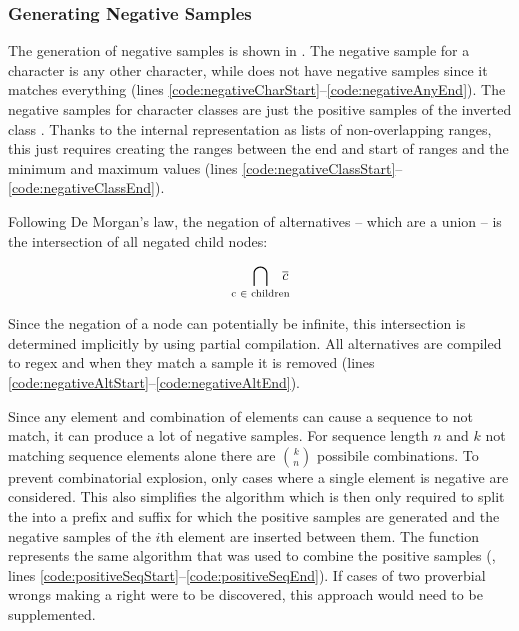 \FloatBarrier
\subsubsection{Generating Negative Samples}

The generation of negative samples is shown in . The negative sample for a character is any other character, while  does not have negative samples since it matches everything (lines \ref{code:negativeCharStart}--\ref{code:negativeAnyEnd}). The negative samples for character classes are just the positive samples of the inverted class . Thanks to the internal representation as lists of non-overlapping ranges, this just requires creating the ranges between the end and start of ranges and the minimum and maximum values (lines \ref{code:negativeClassStart}--\ref{code:negativeClassEnd}).

Following De Morgan's law, the negation of alternatives -- which are a union -- is the intersection of all negated child nodes:

\vspace{-1em}
\begin{equation*}
    \bigcap_{\text{c } \in \text{ children}} \hspace{-.7em}\overline{c}
\end{equation*}
\vspace{-1em}

Since the negation of a node can potentially be infinite, this intersection is determined implicitly by using partial compilation. All alternatives are compiled to regex and when they match a sample it is removed (lines \ref{code:negativeAltStart}--\ref{code:negativeAltEnd}).

Since any element and combination of elements can cause a sequence to not match, it can produce a lot of negative samples. For sequence length $n$ and $k$ not matching sequence elements alone there are ${k}\choose{n}$ possibile combinations. To prevent combinatorial explosion, only cases where a single element is negative are considered. This also simplifies the algorithm which is then only required to split the  into a prefix and suffix for which the positive samples are generated and the negative samples of the $i$th element are inserted between them. The function  represents the same algorithm that was used to combine the positive samples (, lines \ref{code:positiveSeqStart}--\ref{code:positiveSeqEnd}). If cases of two proverbial wrongs making a right were to be discovered, this approach would need to be supplemented.

